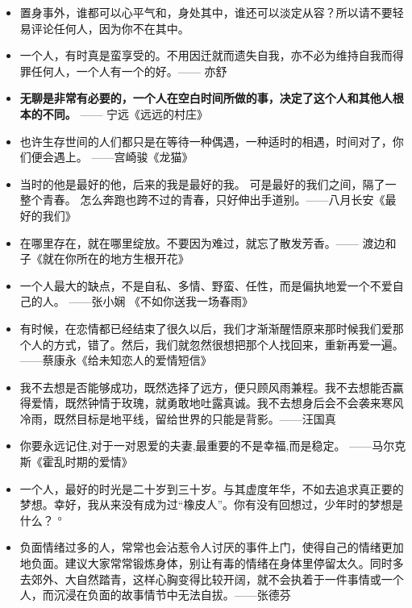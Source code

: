 \documentclass[UTF8,a4paper,8pt]{ctexbook}
\begin{document}
\begin{itemize}
		\item 置身事外，谁都可以心平气和，身处其中，谁还可以淡定从容？所以请不要轻易评论任何人，因为你不在其中。
		
		\item 一个人，有时真是蛮享受的。不用因迁就而遗失自我，亦不必为维持自我而得罪任何人，一个人有一个的好。—— 亦舒
		
		\item \textbf{无聊是非常有必要的，一个人在空白时间所做的事，决定了这个人和其他人根本的不同。} —— 宁远《远远的村庄》
		
		\item 也许生存世间的人们都只是在等待一种偶遇，一种适时的相遇，时间对了，你们便会遇上。 ——宫崎骏《龙猫》
		
		\item 当时的他是最好的他，后来的我是最好的我。 可是最好的我们之间，隔了一整个青春。 怎么奔跑也跨不过的青春，只好伸出手道别。——八月长安《最好的我们》
		
		\item 在哪里存在，就在哪里绽放。不要因为难过，就忘了散发芳香。—— 渡边和子《就在你所在的地方生根开花》
		
		\item 一个人最大的缺点，不是自私、多情、野蛮、任性，而是偏执地爱一个不爱自己的人。	——张小娴 《不如你送我一场春雨》
		
		\item 有时候，在恋情都已经结束了很久以后，我们才渐渐醒悟原来那时候我们爱那个人的方式，错了。然后，我们就忽然很想把那个人找回来，重新再爱一遍。——蔡康永《给未知恋人的爱情短信》
		
		\item 我不去想是否能够成功，既然选择了远方，便只顾风雨兼程。我不去想能否赢得爱情，既然钟情于玫瑰，就勇敢地吐露真诚。我不去想身后会不会袭来寒风冷雨，既然目标是地平线，留给世界的只能是背影。——汪国真 
		
		\item 你要永远记住,对于一对恩爱的夫妻,最重要的不是幸福,而是稳定。 ——马尔克斯《霍乱时期的爱情》
		
		\item 一个人，最好的时光是二十岁到三十岁。与其虚度年华，不如去追求真正要的梦想。幸好，我从来没有成为过“橡皮人”。你有没有回想过，少年时的梦想是什么？ °
		
		\item 负面情绪过多的人，常常也会沾惹令人讨厌的事件上门，使得自己的情绪更加地负面。建议大家常常锻炼身体，别让有毒的情绪在身体里停留太久。同时多去郊外、大自然踏青，这样心胸变得比较开阔，就不会执着于一件事情或一个人，而沉浸在负面的故事情节中无法自拔。——张德芬
		

\end{itemize}
\end{document}
